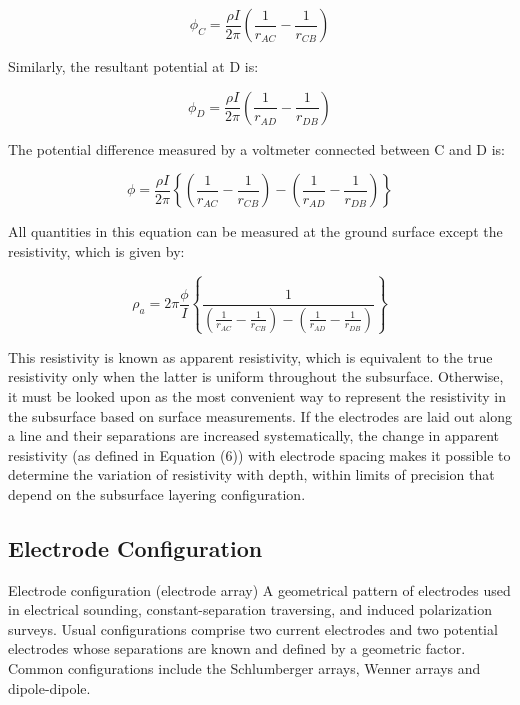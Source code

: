 \documentclass[12pt,a4paper]{report}
\begin{document}
\begin{equation}
\phi_{C} = \frac{\rho I}{2\pi} \left( \frac{1}{r_{AC}} - \frac{1}{r_{CB}} \right)
\end{equation}

Similarly, the resultant potential at D is:

\begin{equation}
\phi_{D} = \frac{\rho I}{2\pi} \left( \frac{1}{r_{AD}} - \frac{1}{r_{DB}} \right)
\end{equation}

The potential difference measured by a voltmeter connected between C and D is:

\begin{equation}
\phi = \frac{\rho I}{2\pi} \left\{ \left( \frac{1}{r_{AC}} - \frac{1}{r_{CB}} \right) - \left( \frac{1}{r_{AD}} - \frac{1}{r_{DB}} \right) \right\}
\end{equation}

All quantities in this equation can be measured at the ground surface except the resistivity, which is given by:

\begin{equation}
\rho_a = 2\pi \frac{\phi}{I} \left\{ \frac{1}{\left( \frac{1}{r_{AC}} - \frac{1}{r_{CB}} \right) - \left( \frac{1}{r_{AD}} - \frac{1}{r_{DB}} \right)} \right\}
\end{equation}

This resistivity is known as apparent resistivity, which is equivalent to the true resistivity only when the latter is uniform throughout the subsurface. Otherwise, it must be looked upon as the most convenient way to represent the resistivity in the subsurface based on surface measurements. If the electrodes are laid out along a line and their separations are increased systematically, the change in apparent resistivity (as defined in Equation (6)) with electrode spacing makes it possible to determine the variation of resistivity with depth, within limits of precision that depend on the subsurface layering configuration.
\subsection{Electrode Configuration}
Electrode configuration (electrode array) A geometrical pattern of electrodes used in electrical sounding, constant-separation traversing, and induced polarization surveys. Usual configurations comprise two current electrodes and two potential electrodes whose separations are known and defined by a geometric factor. Common configurations include the Schlumberger arrays, Wenner arrays and dipole-dipole.
\end{document}
